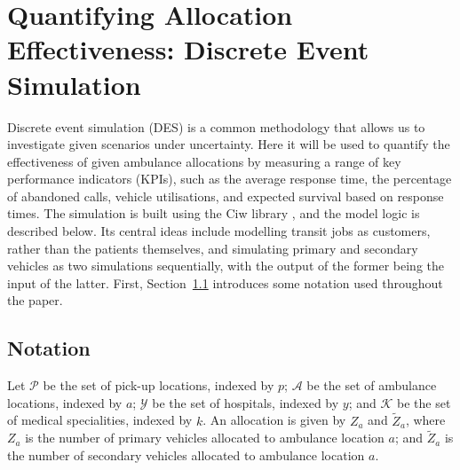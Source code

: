 \documentclass[preprint,12pt]{elsarticle}
\begin{document}
\section{Quantifying Allocation Effectiveness: Discrete Event Simulation}\label{sec:simulation}
Discrete event simulation (DES) is a common methodology that allows us to
investigate given scenarios under uncertainty. Here it will be used to quantify
the effectiveness of given ambulance allocations by measuring a range of key
performance indicators (KPIs), such as the average response time, the percentage of abandoned calls,
vehicle utilisations, and expected survival based on response times.
The simulation is built using the Ciw library \cite{palmer2019ciw}, and the
model logic is described below. Its central ideas include modelling transit jobs
as customers, rather than the patients themselves, and simulating primary and
secondary vehicles as two simulations sequentially, with the output of the
former being the input of the latter.
First, Section~\ref{sec:simulation_notation} introduces some notation used throughout the paper.

\subsection{Notation}\label{sec:simulation_notation}

Let $\mathcal{P}$ be the set of pick-up locations, indexed by $p$; $\mathcal{A}$ be the set of ambulance locations, indexed by $a$; $\mathcal{Y}$ be the set of hospitals, indexed by $y$; and $\mathcal{K}$ be the set of medical specialities, indexed by $k$.
An allocation is given by $Z_a$ and $\tilde{Z}_a$, where $Z_a$ is the number of primary vehicles allocated to ambulance location $a$; and $\tilde{Z}_a$ is the number of secondary vehicles allocated to ambulance location $a$.
\end{document}
